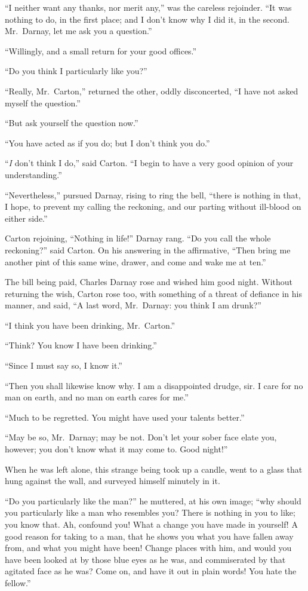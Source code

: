 ``I neither want any thanks, nor merit any,'' was the careless rejoinder.
``It was nothing to do, in the first place; and I don't know why I did it,
in the second.  Mr.\ Darnay, let me ask you a question.''

``Willingly, and a small return for your good offices.''

``Do you think I particularly like you?''

``Really, Mr.\ Carton,'' returned the other, oddly disconcerted, ``I have
not asked myself the question.''

``But ask yourself the question now.''

``You have acted as if you do; but I don't think you do.''

``\emph{I} don't think I do,'' said Carton.  ``I begin to have a very good
opinion of your understanding.''

``Nevertheless,'' pursued Darnay, rising to ring the bell, ``there is
nothing in that, I hope, to prevent my calling the reckoning, and our
parting without ill-blood on either side.''

Carton rejoining, ``Nothing in life!'' Darnay rang.  ``Do you call the
whole reckoning?'' said Carton.  On his answering in the affirmative,
``Then bring me another pint of this same wine, drawer, and come and
wake me at ten.''

The bill being paid, Charles Darnay rose and wished him good night.
Without returning the wish, Carton rose too, with something of a
threat of defiance in his manner, and said, ``A last word, Mr.\ Darnay:
you think I am drunk?''

``I think you have been drinking, Mr.\ Carton.''

``Think?  You know I have been drinking.''

``Since I must say so, I know it.''

``Then you shall likewise know why.  I am a disappointed drudge, sir.
I care for no man on earth, and no man on earth cares for me.''

``Much to be regretted.  You might have used your talents better.''

``May be so, Mr.\ Darnay; may be not.  Don't let your sober face elate you,
however; you don't know what it may come to.  Good night!''

When he was left alone, this strange being took up a candle, went to a
glass that hung against the wall, and surveyed himself minutely in it.

``Do you particularly like the man?'' he muttered, at his own image;
``why should you particularly like a man who resembles you?  There is
nothing in you to like; you know that.  Ah, confound you!  What a
change you have made in yourself!  A good reason for taking to a man,
that he shows you what you have fallen away from, and what you might
have been!  Change places with him, and would you have been looked at
by those blue eyes as he was, and commiserated by that agitated face
as he was?  Come on, and have it out in plain words!  You hate the fellow.''

